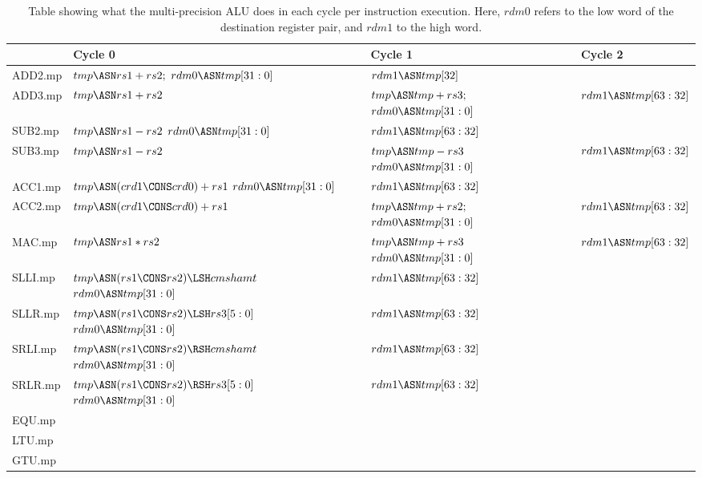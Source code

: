 \documentclass{article}
\begin{document}
\begin{table}[H]
\begin{tabularx}{\textwidth}{l Y Y Y }
\toprule
\textbf{}& \textbf{Cycle 0}& \textbf{Cycle 1}& \textbf{Cycle 2} \\
\midrule
ADD2.mp&
    $tmp \ASN rs1+rs2;$\newline 
    $rdm0\ASN tmp[31:0]$ 
 &  $rdm1\ASN tmp[32]$ 
 & \\
ADD3.mp&
   $tmp \ASN rs1 + rs2$
 & $tmp \ASN tmp + rs3;$\newline
   $rdm0\ASN tmp[31:0]$ 
 & $rdm1\ASN tmp[63:32]$ 
\\
SUB2.mp&
   $tmp \ASN rs1 - rs2$ \newline
   $rdm0\ASN tmp[31:0]$ 
 & $rdm1\ASN tmp[63:32]$ 
 &
\\
SUB3.mp&
   $tmp \ASN rs1 - rs2$ \newline
 &
   $tmp \ASN tmp - rs3$ \newline
   $rdm0\ASN tmp[31:0]$ 
 & $rdm1\ASN tmp[63:32]$ 
\\
ACC1.mp&
    $tmp \ASN (crd1 \CONS crd0) + rs1$\newline 
    $rdm0\ASN tmp[31:0]$ 
 &  $rdm1\ASN tmp[63:32]$ 
 &
\\
ACC2.mp&
    $tmp \ASN (crd1 \CONS crd0) + rs1$\newline 
 &  $tmp \ASN tmp + rs2;$\newline 
    $rdm0\ASN tmp[31:0]$ 
 &  $rdm1\ASN tmp[63:32]$ 
\\
MAC.mp &
    $tmp \ASN rs1 * rs2$ \newline 
 &  
    $tmp \ASN tmp + rs3$\newline 
    $rdm0\ASN tmp[31:0]$ 
 &  $rdm1\ASN tmp[63:32]$ 
\\
SLLI.mp&
    $tmp \ASN (rs1 \CONS rs2) \LSH cmshamt$\newline 
    $rdm0\ASN tmp[31:0]$ 
 &  $rdm1\ASN tmp[63:32]$ 
 &
\\
SLLR.mp&
    $tmp \ASN (rs1 \CONS rs2) \LSH rs3[5:0]$\newline 
    $rdm0\ASN tmp[31:0]$ 
 &  $rdm1\ASN tmp[63:32]$ 
 &
\\
SRLI.mp&
    $tmp \ASN (rs1 \CONS rs2) \RSH cmshamt$\newline 
    $rdm0\ASN tmp[31:0]$ 
 &  $rdm1\ASN tmp[63:32]$ 
 &
\\
SRLR.mp&
    $tmp \ASN (rs1 \CONS rs2) \RSH rs3[5:0]$\newline 
    $rdm0\ASN tmp[31:0]$ 
 &  $rdm1\ASN tmp[63:32]$ 
 &
\\
EQU.mp &
 &
 &
\\
LTU.mp &
 &
 &
\\
GTU.mp &
 &
 &
\\
\bottomrule
\end{tabularx}
\caption{Table showing what the multi-precision ALU does in each cycle
per instruction execution. Here, $rdm0$ refers to the low word of the
destination register pair, and $rdm1$ to the high word.}
\label{tab:mp-alu-exec}
\end{table}
\end{document}
